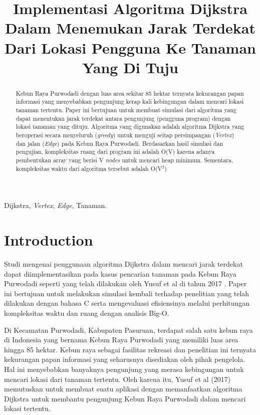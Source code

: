 \documentclass[conference]{IEEEtran}
\begin{document}
\title{Implementasi Algoritma Dijkstra Dalam
Menemukan Jarak Terdekat Dari Lokasi Pengguna
Ke Tanaman Yang Di Tuju}

\author{
}

\maketitle

\begin{abstract}
Kebun Raya Purwodadi dengan luas area sekitar 85 hektar ternyata kekurangan papan informasi yang menyebabkan pengunjung kerap kali kebingungan dalam mencari lokasi tanaman tertentu.
Paper ini bertujuan untuk membuat simulasi dari algoritma yang dapat menentukan jarak terdekat antara pengunjung (pengguna program) dengan lokasi tanaman yang dituju.
Algoritma yang digunakan adalah algoritma Dijkstra yang beroperasi secara menyeluruh (\textit{greedy}) untuk menguji seitap persimpangan (\textit{Vertex}) dan jalan (\textit{Edge}) pada Kebun Raya Purwodadi.
Berdasarkan hasil simulasi dan pengujian, kompleksitas ruang dari program ini adalah O(V) karena adanya pembentukan array yang berisi V \textit{nodes} untuk mencari heap minimum.
Sementara, kompleksitas waktu dari algoritma tersebut adalah O(V$^{2}$)
\end{abstract}

\begin{IEEEkeywords}
    Dijkstra, \textit{Vertex}, \textit{Edge}, Tanaman.
\end{IEEEkeywords}

\section{Introduction}
Studi mengenai penggunaan algoritma Dijkstra dalam mencari jarak terdekat dapat diimplementasikan pada kasus pencarian tanaman pada Kebun Raya Purwodadi seperti yang telah dilakukan oleh Yusuf et al di tahun 2017 \cite{b1}.
Paper ini bertujuan untuk melakukan simulasi kembali terhadap penelitian yang telah dilakukan dengan bahasa C serta mengevaluasi efisiensinya melalui perhitungan kompleksitas waktu dan ruang dengan analisis Big-O. 

Di Kecamatan Purwodadi, Kabupaten Pasuruan, terdapat salah satu kebun raya di Indonesia yang bernama Kebun Raya Purwodadi yang memiliki luas area hingga 85 hektar.
Kebun raya sebagai fasilitas rekreasi dan penelitian ini ternyata kekurangan papan informasi yang seharusnya disediakan oleh pihak pengelola. Hal ini menyebabkan banyaknya pengunjung yang merasa kebingungan untuk mencari lokasi dari tanaman tertentu.
Oleh karena itu, Yusuf et al (2017) memutuskan untuk membuat suatu aplikasi dengan memanfaatkan algoritma Dijkstra untuk membantu pengunjung Kebun Raya Purwodadi dalam mencari lokasi tertentu. 
\end{document}
